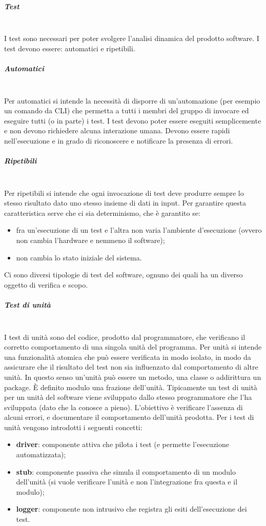 \subparagraph{Test} \mbox{}\\
I test sono necessari per poter svolgere l'analisi dinamica del prodotto software.
I test devono essere: automatici e ripetibili.
\subparagraph*{Automatici} \mbox{}\\ 
Per automatici si intende la necessità di disporre di un'automazione (per esempio un comando da CLI) che permetta a tutti i membri del gruppo di invocare ed eseguire tutti (o in parte) i test.
I test devono poter essere eseguiti semplicemente e non devono richiedere alcuna interazione umana.
Devono essere rapidi nell’esecuzione e in grado di riconoscere e notificare la presenza di errori.
\subparagraph*{Ripetibili} \mbox{}\\
Per ripetibili si intende che ogni invocazione di test deve produrre sempre lo stesso risultato dato uno stesso insieme di dati in input.
Per garantire questa caratteristica serve che ci sia determinismo, che è garantito se:
\begin{itemize}
    \item fra un'esecuzione di un test e l'altra non varia l'ambiente d'esecuzione (ovvero non cambia l'hardware e nemmeno il software);
    \item non cambia lo stato iniziale del sistema.
\end{itemize}

Ci sono diversi tipologie di test del software, ognuno dei quali ha un diverso oggetto di verifica e scopo.

\subparagraph{Test di unità} \mbox{}\\
I test di unità sono del codice, prodotto dal programmatore, che verificano il corretto comportamento di una singola unità del programma.
Per unità si intende una funzionalità atomica che può essere verificata in modo isolato, in modo da assicurare che il risultato del test non sia influenzato dal comportamento di altre unità. In questo senso un'unità può essere un metodo, una classe o addirittura un package.
È definito modulo una frazione dell'unità.
Tipicamente un test di unità per un unità del software viene sviluppato dallo stesso programmatore che l'ha sviluppata (dato che la conosce a pieno).
L'obiettivo è verificare l’assenza di alcuni errori, e documentare il comportamento dell’unità prodotta.
Per i test di unità vengono introdotti i seguenti concetti:
\begin{itemize}
    \item \textbf{driver}: componente attiva che pilota i test (e permette l'esecuzione automatizzata);
    \item \textbf{stub}: componente passiva che simula il comportamento di un modulo dell'unità (si vuole verificare l'unità e non l'integrazione fra questa e il modulo);
    \item \textbf{logger}: componente non intrusivo che registra gli esiti dell'esecuzione dei test.
\end{itemize}


